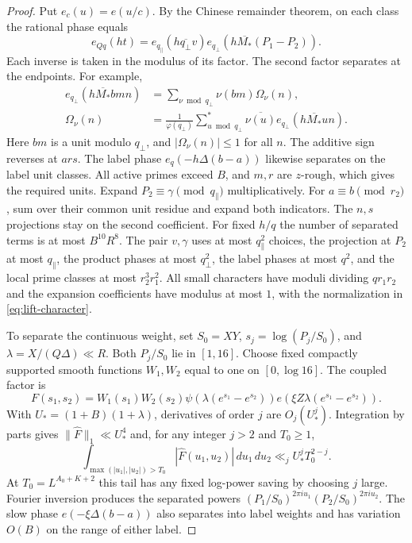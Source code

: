 \documentclass[11pt]{amsart}
\numberwithin{equation}{section}
\theoremstyle{remark}
\begin{document}
\begin{proof}
Put $e_c(u)=e(u/c)$. By the Chinese remainder theorem, on each class
the rational phase equals
\[
 e_{Qq}(ht)=e_{q_\parallel}(h\overline{q_\perp}v)
             e_{q_\perp}(h\overline{M_*}(P_1-P_2)).
\]
Each inverse is taken in the modulus of its factor. The second factor
separates at the endpoints. For example,
\begin{align*}
 e_{q_\perp}(h\overline{M_*}bmn)
  &=\sum_{\nu\bmod q_\perp}\nu(bm)\Omega_\nu(n),\\
 \Omega_\nu(n)&=\frac{1}{\varphi(q_\perp)}
  \sum_{u\bmod q_\perp}^{*}\overline{\nu(u)}
       e_{q_\perp}(h\overline{M_*}un).
\end{align*}
Here $bm$ is a unit modulo $q_\perp$, and $|\Omega_\nu(n)|\leq1$
for all $n$. The additive sign reverses at $ars$. The label phase
$e_q(-h\Delta(b-a))$ likewise separates on the label unit classes.
All active primes exceed $B$, and $m,r$ are $z$-rough, which gives
the required units. Expand $P_2\equiv\gamma\pmod{q_\parallel}$
multiplicatively. For $a\equiv b\pmod{r_2}$, sum over their common unit
residue and expand both indicators. The $n,s$ projections stay on
the second coefficient. For fixed $h/q$ the number of separated
terms is at most $B^{10}R^8$. The pair $v,\gamma$ uses at most
$q_\parallel^2$ choices, the projection at $P_2$ at most $q_\parallel$,
the product phases at most $q_\perp^2$, the label phases at most $q^2$,
and the local prime classes at most $r_2^3r_1^2$. All small characters
have moduli dividing $qr_1r_2$ and the expansion coefficients have
modulus at most $1$, with the normalization in \eqref{eq:lift-character}.

To separate the continuous weight, set $S_0=XY$, $s_j=\log(P_j/S_0)$,
and $\lambda=X/(Q\Delta)\ll R$. Both $P_j/S_0$ lie in $[1,16]$.
Choose fixed compactly supported smooth functions $W_1,W_2$ equal to
one on $[0,\log 16]$. The coupled factor is
\[
 F(s_1,s_2)=W_1(s_1)W_2(s_2)
   \psi\!\left(\lambda(e^{s_1}-e^{s_2})\right)
   e\!\left(\xi Z\lambda(e^{s_1}-e^{s_2})\right).
\]
With $U_*=(1+B)(1+\lambda)$, derivatives of order $j$ are
$O_j(U_*^j)$. Integration by parts gives $\|\widehat F\|_1\ll U_*^4$
and, for any integer $j>2$ and $T_0\geq1$,
\[
 \int_{\max(|u_1|,|u_2|)>T_0}|\widehat F(u_1,u_2)|\,du_1\,du_2
   \ll_j U_*^j T_0^{2-j}.
\]
At $T_0=L^{A_0+K+2}$ this tail has any fixed log-power saving by
choosing $j$ large. Fourier inversion produces the separated powers
$(P_1/S_0)^{2\pi i u_1}(P_2/S_0)^{2\pi i u_2}$. The slow phase
$e(-\xi\Delta(b-a))$ also separates into label weights and has
variation $O(B)$ on the range of either label.


\end{proof}
\end{document}
